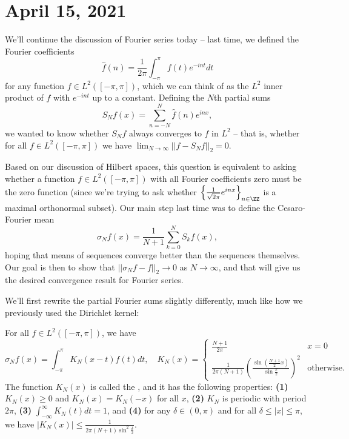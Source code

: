 
\pagebreak\section*{April 15, 2021}

We'll continue the discussion of Fourier series today -- last time, we defined the Fourier coefficients 
\[
    \hat{f}(n) = \frac{1}{2\pi} \int_{-\pi}^{\pi} f(t) e^{-int} dt
\]
for any function $f \in L^2([-\pi, \pi])$, which we can think of as the $L^2$ inner product of $f$ with $e^{-int}$ up to a constant. Defining the $N$th partial sums
\[
    S_Nf(x) = \sum_{n=-N}^N \hat{f}(n) e^{inx},
\]
we wanted to know whether $S_Nf$ always converges to $f$ in $L^2$ -- that is, whether for all $f \in L^2([-\pi, \pi])$ we have $\lim_{N \to \infty} ||f - S_N f||_2 = 0$.

Based on our discussion of Hilbert spaces, this question is equivalent to asking whether a function $f \in L^2([-\pi, \pi])$ with all Fourier coefficients zero must be the zero function (since we're trying to ask whether $\left\{\frac{1}{\sqrt{2\pi}} e^{inx}\right\}_{n \in \ZZ}$ is a maximal orthonormal subset). Our main step last time was to define the Cesaro-Fourier mean 
\[
    \sigma_N f(x) = \frac{1}{N+1} \sum_{k=0}^N S_k f(x),
\]
hoping that means of sequences converge better than the sequences themselves. Our goal is then to show that $||\sigma_N f - f||_2 \to 0$ as $N \to \infty$, and that will give us the desired convergence result for Fourier series.

We'll first rewrite the partial Fourier sums slightly differently, much like how we previously used the Dirichlet kernel:

\begin{proposition}
For all $f \in L^2([-\pi, \pi])$, we have 
\[
    \sigma_N f(x) = \int_{-\pi}^\pi K_N(x-t) f(t) dt, \quad K_N(x) = \begin{cases} \frac{N+1}{2\pi} & x = 0 \\ \frac{1}{2\pi(N+1)} \left(\frac{\sin\left(\frac{N+1}{2} x\right)}{\sin \frac{x}{2}}\right)^2 & \text{otherwise}. \end{cases}
\]
The function $K_N(x)$ is called the , and it has the following properties: \textbf{(1)} $K_N(x) \ge 0$ and $K_N(x) = K_N(-x)$ for all $x$, \textbf{(2)} $K_N$ is periodic with period $2\pi$, \textbf{(3)} $\int_{-\infty}^{\infty} K_N(t) dt = 1$, and \textbf{(4)} for any $\delta \in (0, \pi)$ and for all $\delta \le |x| \le \pi$, we have $|K_N(x)| \le \frac{1}{2\pi(N+1) \sin^2\frac{\delta}{2}}$.
\end{proposition}

